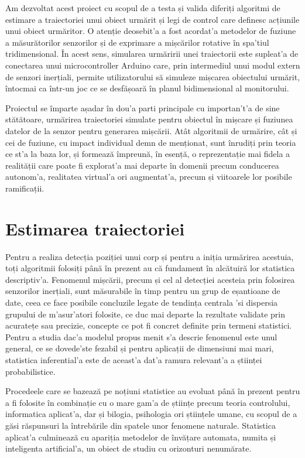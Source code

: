 \documentclass[12pt,a4paper,twoside]{report}
\begin{document}
Am dezvoltat acest proiect cu scopul de a testa și valida diferiți algoritmi de estimare a traiectoriei unui obiect urmărit și legi de control care definesc acțiunile unui obiect urmăritor. O atenție deosebit'a a fost acordat'a metodelor de fuziune a măsurătorilor senzorilor și de exprimare a mișcărilor rotative în spa'tiul tridimensional. În acest sens, simularea urmăririi unei traiectorii este supleat'a de conectarea unui microcontroller Arduino care, prin intermediul unui modul extern de senzori inerțiali, permite utilizatorului să simuleze mișcarea obiectului urmărit, întocmai ca într-un joc ce se desfășoară în planul bidimensional al monitorului. 

Proiectul se împarte așadar în dou'a parti principale cu importan't'a de sine stătătoare, urmărirea traiectoriei simulate pentru obiectul în mișcare și fuziunea datelor de la senzor pentru generarea mișcării. Atât algoritmii de urmărire, cât și cei de fuziune, cu impact individual demn de menționat, sunt înrudiți prin teoria ce st'a la baza lor, și  formează împreună, în esență, o reprezentație mai fidela a realității care poate fi explorat'a mai departe în domenii precum conducerea autonom'a, realitatea virtual'a ori augmentat'a, precum și viitoarele lor posibile ramificații.

\section{Estimarea traiectoriei}


Pentru a realiza detecția poziției unui corp și pentru a iniția urmărirea acestuia, toți algoritmii folosiți până în prezent au că fundament în alcătuiră lor statistica descriptiv'a. Fenomenul mișcării, precum și cel al detecției acesteia prin folosirea senzorilor inerțiali, sunt măsurabile în timp pentru un grup de eșantioane de date, ceea ce face posibile concluzile legate de tendința centrala 'si dispersia grupului de m'asur'atori folosite, ce duc mai departe la rezultate validate prin acuratețe sau precizie, concepte ce pot fi concret definite prin termeni statistici. Pentru a studia dac'a modelul propus menit s'a descrie fenomenul este unul general, ce se dovede'ste fezabil și pentru aplicații de dimensiuni mai mari, statistica inferential'a este de aceast'a dat'a ramura relevant'a a științei probabilistice.

\vspace{5px}

Procedeele care se bazează pe noțiuni statistice au evoluat până în prezent pentru a fi folosite în combinație cu o mare gam'a de științe precum teoria controlului, informatica aplicat'a, dar și bilogia, psihologia ori științele umane, cu scopul de a găsi răspunsuri la întrebările din spatele unor fenomene naturale. Statistica aplicat'a culminează cu apariția metodelor de învățare automata, numita și inteligenta artificial'a, un obiect de studiu cu orizonturi nenumărate. 
\end{document}

